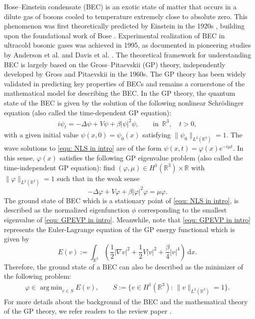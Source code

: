 \documentclass{siamart250211}
\DeclareMathOperator*{\argmin}{arg\,min}
\def\R{\mathbb{R}}
\begin{document}
Bose--Einstein condensate (BEC) is an exotic state of matter that occurs in a dilute gas of bosons cooled to temperature extremely close to absolute zero. This phenomenon was first theoretically predicted by Einstein in the 1920s \cite{Einstein1924}, building upon the foundational work of Bose \cite{Bose1924}. Experimental realization of BEC in ultracold bosonic gases was achieved in 1995, as documented in pioneering studies by Anderson et al. \cite{anderson1995observation} and Davis et al. \cite{davis1995bose}. The theoretical framework for understanding BEC is largely based on the Gross--Pitaevskii (GP) theory, independently developed by Gross \cite{gross1961structure} and Pitaevskii \cite{pitaevskii1961vortex} in the 1960s. The GP theory has been widely validated in predicting key properties of BECs and remains a cornerstone of the mathematical model for describing the BEC. In the GP theory, the quantum state of the BEC is given by the solution of the following nonlinear Schr\"odinger equation (also called the time-dependent GP equation): 
\begin{align}\label{equ: NLS in intro}
    i\psi_t = - \Delta \psi + V \psi + \beta |\psi|^2 \psi, \qquad  \text{in} \,\,\, \R^3, \quad t > 0,
\end{align}
with a given initial value $\psi(x,0) = \psi_0(x)$ satisfying $\|\psi_0\|_{L^2(\R^3)} = 1$. The wave solutions to \eqref{equ: NLS in intro} are of the form $\psi(x,t) = \varphi(x)e^{-i\mu t}$. In this sense, $\varphi(x)$ satisfies the following GP eigenvalue problem (also called the time-independent GP equation): find $(\varphi,\mu) \in H^1(\R^3) \times \R$ with $\|\varphi\|_{L^2(\R^3)} = 1$ such that in the weak sense
\begin{equation}\label{equ: GPEVP in intro}
	- \Delta \varphi + V\varphi + \beta |\varphi|^2\varphi = \mu \varphi.
\end{equation}
The ground state of BEC which is a stationary point of \eqref{equ: NLS in intro}, is described as the normalized eigenfunction $\phi$ corresponding to the smallest eigenvalue of \eqref{equ: GPEVP in intro}. Meanwhile, note that \eqref{equ: GPEVP in intro} represents the Euler-Lagrange equation of the GP energy functional which is given by 
\begin{equation}
	E(v):= \int_{\R^3} \left( \frac12 |\nabla v|^2 + \frac12 V |v|^2 + \frac{\beta}{4} |v|^4 \right) \ \text{d}x.
\end{equation}
Therefore, the ground state of a BEC can also be described as the minimizer of the following problem:
\begin{align}\label{equ: minimize problem}
    \varphi \in \argmin_{v \in S} E(v), \qquad S:=\{ v \in H^1(\R^3): \, \|v\|_{L^2(\R^3)} = 1 \}.
\end{align}
For more details about the background of the BEC and the mathematical theory of the GP theory, we refer readers to the review paper \cite{bao2013mathematical}.
\end{document}
